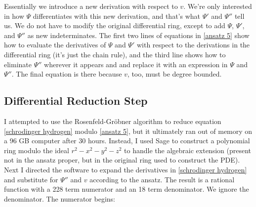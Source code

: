 \documentclass{article}
\begin{document}
Essentially we introduce a new derivation with respect to $v$.
We're only interested in how $\Psi$ differentiates with this new derivation,
and that's what $\Psi'$ and $\Psi''$ tell us.  
We do not have to modify the original differential ring, except
to add $\Psi$, $\Psi'$, and $\Psi''$ as new indeterminates.
The first
two lines of equations in \eqref{ansatz 5} show how to evaluate
the derivatives of $\Psi$ and $\Psi'$ with respect to the
derivations in the differential ring (it's just the chain rule), and the third line
shows how to eliminate $\Psi''$ wherever it appears
and and replace it with an expression in $\Psi$ and $\Psi''$.
The final equation is there because $v$, too, must be degree bounded.

\subsection*{Differential Reduction Step}

I attempted to use the Rosenfeld-Gr\"obner algorithm to reduce equation \eqref{schrodinger hydrogen}
modulo \eqref{ansatz 5}, but it ultimately ran out of memory on a 96 GB computer after
30 hours.  Instead, I used Sage to construct a polynomial ring modulo the ideal
$r^2-x^2-y^2-z^2$ to handle the algebraic extension (present not in the ansatz proper,
but in the original ring used to construct the PDE).  Next I directed the software
to expand the derivatives in \eqref{schrodinger hydrogen} and substitute for $\Psi''$ and $v$
according to the ansatz.  The result is
a rational function
with a 228 term numerator and an 18 term denominator.  We ignore the denominator.  The numerator begins:

\end{document}
